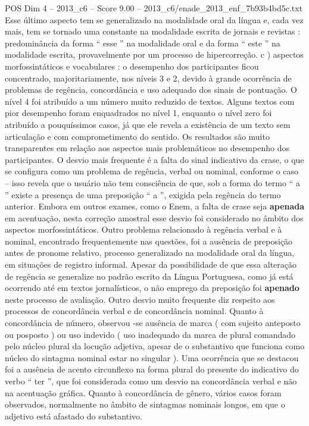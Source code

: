 \begin{textsample}{POS Dim 4 – 2013\_c6 – Score 9.00 – 2013\_c6/enade\_2013\_enf\_7b93b4bd5c.txt}
Esse último aspecto tem se generalizado na modalidade oral da língua e, cada vez mais, tem se tornado uma constante na modalidade escrita de jornais e revistas : predominância da forma “ esse ” na modalidade oral e da forma “ este ” na modalidade escrita, provavelmente por um processo de hipercorreção. c ) aspectos morfossintáticos e vocabulares : o desempenho dos participantes ficou concentrado, majoritariamente, nos níveis 3 e 2, devido à grande ocorrência de problemas de regência, concordância e uso adequado dos sinais de pontuação.
O nível 4 foi atribuído a um número muito reduzido de textos.
Alguns textos com pior desempenho foram enquadrados no nível 1, enquanto o nível zero foi atribuído a pouquíssimos casos, já que ele revela a existência de um texto sem articulação e com comprometimento do sentido.
Os resultados são muito transparentes em relação aos aspectos mais problemáticos no desempenho dos participantes.
O desvio mais frequente é a falta do sinal indicativo da crase, o que se configura como um problema de regência, verbal ou nominal, conforme o caso – isso revela que o usuário não tem consciência de que, sob a forma do termo “ a ” existe a presença de uma preposição “ a ”, exigida pela regência do termo anterior.
Embora em outros exames, como o Enem, a falta de crase seja \textbf{apenada} em acentuação, nesta correção amostral esse desvio foi considerado no âmbito dos aspectos morfossintáticos.
Outro problema relacionado à regência verbal e à nominal, encontrado frequentemente nas questões, foi a ausência de preposição antes de pronome relativo, processo generalizado na modalidade oral da língua, em situações de registro informal.
Apesar da possibilidade de que essa alteração de regência se generalize no padrão escrito da Língua Portuguesa, como já está ocorrendo até em textos jornalísticos, o não emprego da preposição foi \textbf{apenado} neste processo de avaliação.
Outro desvio muito frequente diz respeito aos processos de concordância verbal e de concordância nominal.
Quanto à concordância de número, observou -se ausência de marca ( com sujeito anteposto ou posposto ) ou uso indevido ( uso inadequado da marca de plural comandado pelo núcleo plural da locução adjetiva, apesar de o substantivo que funciona como núcleo do sintagma nominal estar no singular ).
Uma ocorrência que se destacou foi a ausência de acento circunflexo na forma plural do presente do indicativo do verbo “ ter ”, que foi considerada como um desvio na concordância verbal e não na acentuação gráfica.
Quanto à concordância de gênero, vários casos foram observados, normalmente no âmbito de sintagmas nominais longos, em que o adjetivo está afastado do substantivo.

\end{textsample}
